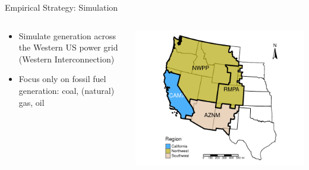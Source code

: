\documentclass[11pt, aspectratio = 169]{beamer}
\begin{document}
\begin{frame}{Empirical Strategy: Simulation}
    
\begin{columns}
    \begin{column}{0.5\textwidth}
    
    \begin{itemize}
        \item Simulate generation across the Western US power grid (Western Interconnection)
        \vspace*{1em}
        \item Focus only on fossil fuel generation: coal, (natural) gas, oil
    \end{itemize}    

    \end{column}
    \begin{column}{0.5\textwidth}
        \includegraphics[width = \textwidth]{figures/chapter3_figures/WECC_map.pdf}
    \end{column}
\end{columns}

\end{frame}
\end{document}
